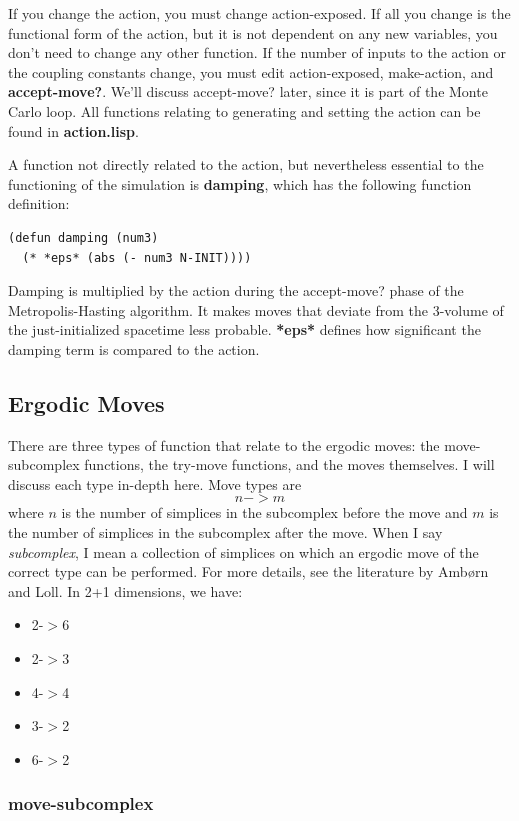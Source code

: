 \documentclass[12pt]{article}
\begin{document}
If you change the action, you must change action-exposed. If all you
change is the functional form of the action, but it is not dependent
on any new variables, you don't need to change any other function. If
the number of inputs to the action or the coupling constants change,
you must edit action-exposed, make-action, and
\textbf{accept-move?}. We'll discuss accept-move? later, since it is
part of the Monte Carlo loop. All functions relating to generating and
setting the action can be found in \textbf{action.lisp}.

A function not directly related to the action, but nevertheless
essential to the functioning of the simulation is \textbf{damping},
which has the following function definition:
\begin{lstlisting}
(defun damping (num3)
  (* *eps* (abs (- num3 N-INIT))))
\end{lstlisting}
Damping is multiplied by the action during the accept-move? phase of
the Metropolis-Hasting algorithm. It makes moves that deviate from the
3-volume of the just-initialized spacetime less
probable. \textbf{*eps*} defines how significant the damping term is
compared to the action.

\subsection{Ergodic Moves}
There are three types of function that relate to the ergodic moves:
the move-subcomplex functions, the try-move functions, and the moves
themselves. I will discuss each type in-depth here. Move types are 
$$n->m$$
where $n$ is the number of simplices in the subcomplex before the move
and $m$ is the number of simplices in the subcomplex after the
move. When I say \textit{subcomplex}, I mean a collection of simplices
on which an ergodic move of the correct type can be performed. For
more details, see the literature by Amb\o rn and Loll. In 2+1
dimensions, we have:
\begin{itemize}
\item 2-$>$6
\item 2-$>$3
\item 4-$>$4
\item 3-$>$2
\item 6-$>$2
\end{itemize}

\subsubsection{move-subcomplex}
\end{document}

